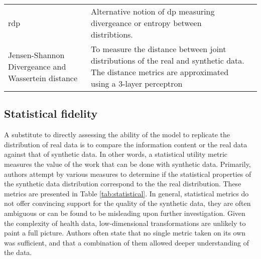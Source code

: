 \begin{table}[H]
\begin{tabularx}{\textwidth}{@{} p{} X  p{} @{}}
                \gls{rdp} & Alternative notion of \gls{dp} measuring divergeance or entropy between distribtions.& \cite{tanti2019}\\
                
                Jensen-Shannon Divergeance and Wassertein distance  & To measure the distance between joint distributions of the real and synthetic data. The distance metrics are approximated using a 3-layer perceptron & \cite{Yoon2020-anon}\\
                
                
                \bottomrule
        
            \end{tabularx}
        \end{table}

    \subsection{Statistical fidelity}
        A substitute to directly assessing the ability of the model to replicate the distribution of real data is to compare the information content or the real data against that of synthetic data. In other words, a statistical utility metric measures the value of the work that can be done with synthetic data. Primarily, authors attempt by various measures to determine if the statistical properties of the synthetic data distribution correspond to the the real distribution. These metrics are presented in Table \ref{tab:statistical}. In general, statistical metrics do not offer convincing support for the quality of the synthetic data, they are often ambiguous or can be found to be misleading upon further investigation. Given the complexity of health data, low-dimensional transformations are unlikely to paint a full picture. Authors often state that no single metric taken on its own was sufficient, and that a combination of them allowed deeper understanding of the data. 
     

